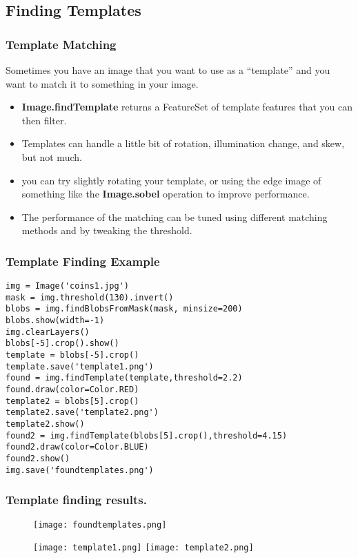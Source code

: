 \documentclass[compress]{beamer}
\begin{document}
\subsection{Finding Templates}
\begin{frame}
  \frametitle{Template Matching}
Sometimes you have an image that you want to use as a ``template'' and you
want to match it to something in your image. 
\begin{itemize}
\item \textbf{Image.findTemplate} returns a FeatureSet of template features
  that you can then filter.
\item Templates can handle a little bit of rotation, illumination
  change, and skew, but not much.
\item you can try slightly rotating your template, or using the edge
  image of something like the \textbf{Image.sobel} operation to
  improve performance.
\item The performance of the matching can be tuned using different
  matching methods and by tweaking the threshold.
\end{itemize}
\end{frame}
\begin{frame}[fragile] 
\frametitle{Template Finding Example}
\begin{example}
\begin{verbatim}
img = Image('coins1.jpg')
mask = img.threshold(130).invert()
blobs = img.findBlobsFromMask(mask, minsize=200)
blobs.show(width=-1)
img.clearLayers()
blobs[-5].crop().show()
template = blobs[-5].crop()
template.save('template1.png')
found = img.findTemplate(template,threshold=2.2)
found.draw(color=Color.RED)
template2 = blobs[5].crop()
template2.save('template2.png')
template2.show()
found2 = img.findTemplate(blobs[5].crop(),threshold=4.15)
found2.draw(color=Color.BLUE)
found2.show()
img.save('foundtemplates.png')
\end{verbatim}
\end{example}
\end{frame} 
\begin{frame}
\frametitle{Template finding results.}
 \begin{figure}
     \texttt{[image: foundtemplates.png]}
 \end{figure}
 \begin{figure}
     \texttt{[image: template1.png]}
     \quad
     \texttt{[image: template2.png]}
 \end{figure}
\end{frame}
\end{document}
